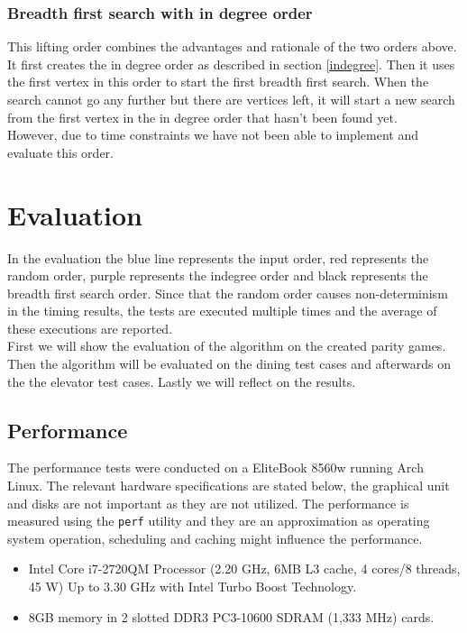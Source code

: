 \documentclass[10pt,a4paper]{article}
\begin{document}
\subsubsection{Breadth first search with in degree order}
This lifting order combines the advantages and rationale of the two orders above. It first creates the in degree order as described in section \ref{indegree}. Then it uses the first vertex in this order to start the first breadth first search. When the search cannot go any further but there are vertices left, it will start a new search from the first vertex in the in degree order that hasn't been found yet.\\
However, due to time constraints we have not been able to implement and evaluate this order. 

\section{Evaluation}\label{eval}

In the evaluation the blue line represents the input order, red represents the random order, purple represents the indegree order and black represents the breadth first search order. Since that the random order causes non-determinism in the timing results, the tests are executed multiple times and the average of these executions are reported.\\
First we will show the evaluation of the algorithm on the created parity games. Then the algorithm will be evaluated on the dining test cases and afterwards on the the elevator test cases. Lastly we will reflect on the results.


\subsection{Performance}

The performance tests were conducted on a EliteBook 8560w running Arch Linux. The relevant hardware specifications are stated below, the graphical unit and disks are not important as they are not utilized. The performance is measured using the \verb|perf| utility and they are an approximation as operating system operation, scheduling and caching might influence the performance.

\begin{itemize}
	\item Intel Core i7-2720QM Processor (2.20 GHz, 6MB L3 cache, 4 cores/8 threads, 45 W) Up to 3.30 GHz with Intel Turbo Boost Technology.
	
	\item 8GB memory in 2 slotted DDR3 PC3-10600 SDRAM (1,333 MHz) cards.
\end{itemize}
\end{document}
